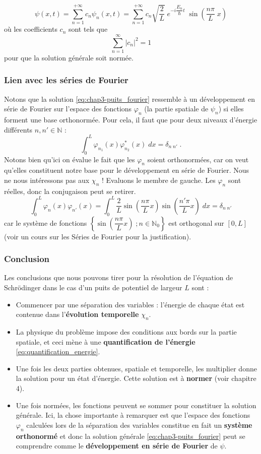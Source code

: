 \documentclass{book}
\begin{document}
\begin{equation}\label{eq:chap3-puits_fourier}
  \psi(x,t) = \sum_{n=1} ^{+\infty} c_n \psi_n(x,t)  = \sum_{n=1} ^{+\infty} c_n \sqrt{\dfrac{2 }{L}} \; e^{-i \dfrac{E_n}{\hbar}t} \; \sin\left(\dfrac{n\pi}{L} \; x\right)
\end{equation}
où les coefficients $c_n$ sont tels que 
$$
\sum_{n=1} ^{\infty} |c_n|^2 = 1
$$
pour que la solution générale soit normée. 

\subsubsection{Lien avec les séries de Fourier}
Notons que la solution \eqref{eq:chap3-puits_fourier} ressemble à un développement en série de Fourier sur l'espace des fonctions $\varphi_n$ (la partie spatiale de $\psi_n$) si elles forment une base orthonormée. Pour cela, il faut que pour deux niveaux d'énergie différents $n, n' \in \mathbb{N}$ :
$$
\int_0 ^L \varphi_{n_1}(x) \varphi_{n_2}^*(x) \; dx = \delta_{n\; n'} \; .
$$
Notons bien qu'ici on évalue le fait que les $\varphi_n$ soient orthonormées, car on veut qu'elles constituent notre base pour le développement en série de Fourier. Nous ne nous intéressons pas aux $\chi_n$ ! Evaluons le membre de gauche. Les $\varphi_n$ sont réelles, donc la conjugaison peut se retirer.
$$
\int_0 ^L \varphi_n(x) \varphi_{n'}(x) = 
\int_0 ^L \dfrac{2 }{L} \sin\left(\dfrac{n\pi}{L} x\right)\sin\left(\dfrac{n'\pi}{L} x\right) \; dx = \delta_{n\; n'}
$$
car le système de fonctions $\left\{\sin\left(\dfrac{n\pi}{L} x\right)\; ; n\in\mathbb{N}_0\right\}$ est orthogonal sur $[0,L]$ (voir un cours sur les Séries de Fourier pour la justification).

\subsubsection{Conclusion}
Les conclusions que nous pouvons tirer pour la résolution de l'équation de Schrödinger dans le cas d'un puits de potentiel de largeur $L$ sont :
\begin{itemize}
  \item Commencer par une séparation des variables : l'énergie de chaque état est contenue dans l'\textbf{évolution temporelle} $\chi_n$.
  \item La physique du problème impose des conditions aux bords sur la partie spatiale, et ceci mène à une \textbf{quantification de l'énergie} \eqref{eq:quantification_energie}.
  \item Une fois les deux parties obtenues, spatiale et temporelle, les multiplier donne la solution pour un état d'énergie. Cette solution est à \textbf{normer} (voir chapitre 4).
  \item Une fois normées, les fonctions peuvent se sommer pour constituer la solution générale. Ici, la chose importante à remarquer est que l'espace des fonctions $\varphi_n$ calculées lors de la séparation des variables constitue en fait un \textbf{système orthonormé} et donc la solution générale \eqref{eq:chap3-puits_fourier} peut se comprendre comme le \textbf{développement en série de Fourier} de $\psi$.
\end{itemize}
\end{document}
